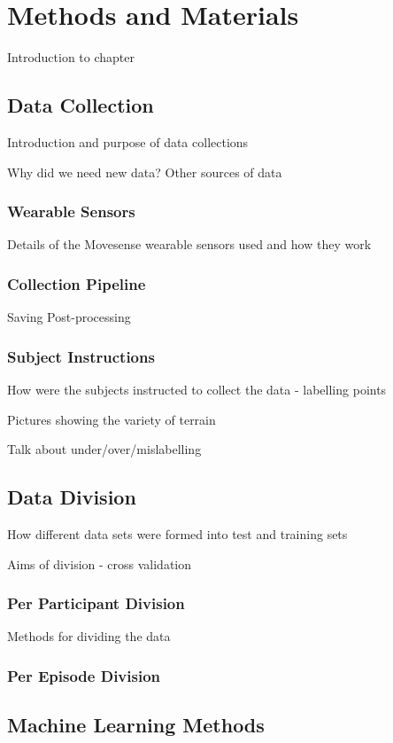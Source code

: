 \chapter{Methods and Materials}

Introduction to chapter

\section{Data Collection}
Introduction and purpose of data collections

Why did we need new data? Other sources of data


\subsection{Wearable Sensors}
Details of the Movesense wearable sensors used and how they work


\subsection{Collection Pipeline}
Saving 
Post-processing

\subsection{Subject Instructions}
How were the subjects instructed to collect the data - labelling points

Pictures showing the variety of terrain

Talk about under/over/mislabelling


\section{Data Division}
How different data sets were formed into test and training sets

Aims of division - cross validation

\subsection{Per Participant Division}
Methods for dividing the data

\subsection{Per Episode Division}



\section{Machine Learning Methods}

